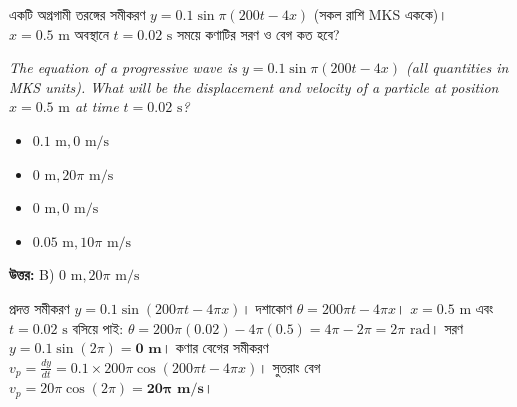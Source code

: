 \documentclass[12pt, a4paper]{article}
\begin{document}
\begin{tcolorbox}[questionbox={প্রশ্ন (Question) 4}]
    \noindent
    একটি অগ্রগামী তরঙ্গের সমীকরণ $y = 0.1 \sin \pi (200t - 4x)$ (সকল রাশি MKS এককে)। $x = 0.5\text{ m}$ অবস্থানে $t = 0.02\text{ s}$ সময়ে কণাটির সরণ ও বেগ কত হবে?
    
    \vspace{0.8em}
    \begin{english}
    \noindent\textit{\color{darkgray}
    The equation of a progressive wave is $y = 0.1 \sin \pi (200t - 4x)$ (all quantities in MKS units). What will be the displacement and velocity of a particle at position $x = 0.5\text{ m}$ at time $t = 0.02\text{ s}$?
    }
    \end{english}
\end{tcolorbox}

\begin{itemize}[label={}, leftmargin=1cm, itemsep=0.5em]
    \item[\textbf{A)}] $0.1\text{ m}, 0\text{ m/s}$
    \item[\textbf{B)}] $0\text{ m}, 20\pi\text{ m/s}$
    \item[\textbf{C)}] $0\text{ m}, 0\text{ m/s}$
    \item[\textbf{D)}] $0.05\text{ m}, 10\pi\text{ m/s}$
\end{itemize}

\vspace{0.5em}
\begin{tcolorbox}[answerbox]
    \textbf{\color{success} উত্তর:} B) $0\text{ m}, 20\pi\text{ m/s}$
\end{tcolorbox}
\vspace{1em}

\begin{tcolorbox}[solutionbox={সমাধান (Solution)}]
    \noindent
    প্রদত্ত সমীকরণ $y = 0.1 \sin (200\pi t - 4\pi x)$। দশাকোণ $\theta = 200\pi t - 4\pi x$। $x = 0.5\text{ m}$ এবং $t = 0.02\text{ s}$ বসিয়ে পাই: $\theta = 200\pi(0.02) - 4\pi(0.5) = 4\pi - 2\pi = 2\pi\text{ rad}$। সরণ $y = 0.1 \sin(2\pi) = \mathbf{0\text{ m}}$। কণার বেগের সমীকরণ $v_p = \frac{dy}{dt} = 0.1 \times 200\pi \cos (200\pi t - 4\pi x)$। সুতরাং বেগ $v_p = 20\pi \cos(2\pi) = \mathbf{20\pi\text{ m/s}}$।
\end{tcolorbox}

\vspace{2em}
\end{document}
